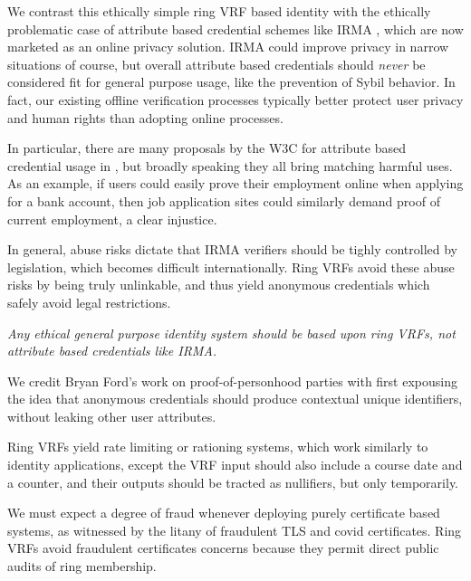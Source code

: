 We contrast this ethically simple ring VRF based identity with the
ethically problematic case of attribute based credential schemes like
IRMA \cite{IRMA_credentials}, which are now marketed as an online privacy solution.
IRMA could improve privacy in narrow situations of course, but
overall attribute based credentials should {\it never} be considered
fit for general purpose usage, like the prevention of Sybil behavior.
In fact, our existing offline verification processes typically better
protect user privacy and human rights than adopting online processes.

In particular, there are many proposals by the W3C for attribute based
credential usage in \cite{w3c_vc_use_cases}, but broadly speaking they
all bring matching harmful uses.  %
As an example, if users could easily prove their employment online when
applying for a bank account, then job application sites could similarly
demand proof of current employment, a clear injustice.

In general, abuse risks dictate that IRMA verifiers should be tighly
controlled by legislation, which becomes difficult internationally. 
%
Ring VRFs avoid these abuse risks by being truly unlinkable, and thus
yield anonymous credentials which safely avoid legal restrictions.

{\it Any ethical general purpose identity system should be based
upon ring VRFs, not attribute based credentials like IRMA.}

We credit Bryan Ford's work on proof-of-personhood parties \cite{pop2008,pop2017}
with first expousing the idea that anonymous credentials should produce
contextual unique identifiers, without leaking other user attributes.


\smallskip

Ring VRFs yield rate limiting or rationing systems, which work
similarly to identity applications, except the VRF input should also
include a course date and a counter, and
 their outputs should be tracted as nullifiers, but only temporarily.

We must expect a degree of fraud whenever deploying purely certificate
based systems, as witnessed by the litany of fraudulent TLS and covid
certificates.  Ring VRFs avoid fraudulent certificates concerns because
they permit direct public audits of ring membership.

